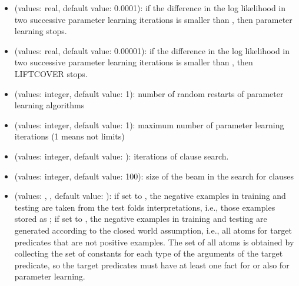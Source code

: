 \documentclass[letterpaper,10pt,english]{sphinxmanual}
\begin{document}
\begin{itemize}
\begin{itemize}
\item {} 
\sphinxAtStartPar
{} (values: real, default value: 0.0001): if the difference in the log likelihood in two successive parameter learning iterations is smaller than , then parameter learning stops.

\item {} 
\sphinxAtStartPar
{} (values: real, default value: 0.00001): if the difference in the log likelihood in two successive parameter learning iterations is smaller than , then LIFTCOVER stops.

\item {} 
\sphinxAtStartPar
{} (values: integer, default value: 1): number of random restarts of parameter learning algorithms

\item {} 
\sphinxAtStartPar
{} (values: integer, default value: \sphinxhyphen{}1): maximum number of parameter learning iterations (\sphinxhyphen{}1 means not limits)

\item {} 
\sphinxAtStartPar
{} (values: integer, default value: ): iterations of clause search.

\item {} 
\sphinxAtStartPar
{} (values: integer, default value: 100): size of the beam in the search for clauses

\item {} 
\sphinxAtStartPar
{} (values: , , default value: ): if set to , the negative examples in training and testing are taken from the test folds interpretations, i.e., those examples  stored as ; if set to , the negative examples in training and testing are generated according to the closed world assumption, i.e., all atoms for target predicates that are not positive examples. The set of all atoms is obtained by collecting the set of constants for each type of the arguments of the target predicate, so the target predicates must have at least one fact for  or  also for parameter learning.


\end{itemize}
\end{itemize}
\end{document}
